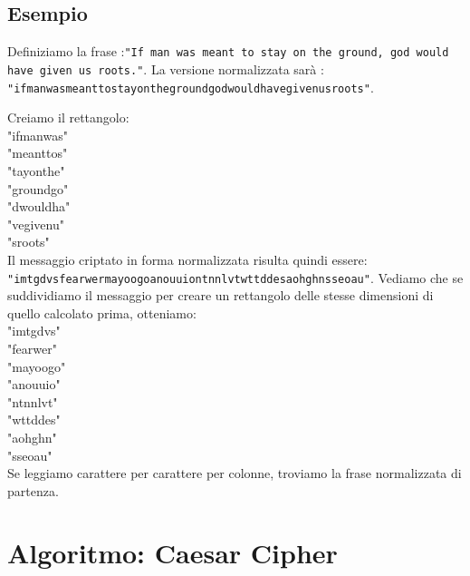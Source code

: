 \subsection{Esempio}
Definiziamo la frase :\texttt{"If man was meant to stay on the ground, god would have given us roots."}.
La versione normalizzata sarà : \texttt{"ifmanwasmeanttostayonthegroundgodwouldhavegivenusroots"}.

Creiamo il rettangolo: \\

"ifmanwas" \\
"meanttos" \\
"tayonthe" \\ 
"groundgo" \\
"dwouldha" \\
"vegivenu" \\
"sroots\;\;\;\;" \\

Il messaggio criptato in forma normalizzata risulta quindi essere: \texttt{"imtgdvsfearwermayoogoanouuiontnnlvtwttddesaohghnsseoau"}.
Vediamo che se suddividiamo il messaggio per creare un rettangolo delle stesse dimensioni di quello calcolato prima, otteniamo: \\

"imtgdvs" \\
"fearwer" \\
"mayoogo" \\
"anouuio" \\
"ntnnlvt" \\
"wttddes" \\
"aohghn\;\;" \\
"sseoau\;\;" \\

Se leggiamo carattere per carattere per colonne, troviamo la frase normalizzata di partenza.

\section{Algoritmo: Caesar Cipher}
